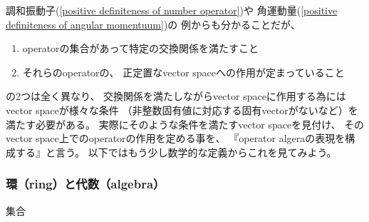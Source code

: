 調和振動子(\ref{positive definiteness of number operator})や
角運動量(\ref{positive definiteness of angular momentuum})の
例からも分かることだが、
\begin{enumerate}
    \item operatorの集合があって特定の交換関係を満たすこと
    \item それらのoperatorの、
        正定置なvector spaceへの作用が定まっていること
\end{enumerate}
の2つは全く異なり、
交換関係を満たしながらvector spaceに作用する為には
vector spaceが様々な条件
（非整数固有値に対応する固有vectorがないなど）を満たす必要がある。
実際にそのような条件を満たすvector spaceを見付け、
そのvector space上でのoperatorの作用を定める事を、
『operator algeraの表現を構成する』と言う。
以下ではもう少し数学的な定義からこれを見てみよう。

\subsubsection{環（ring）と代数（algebra）}

集合
